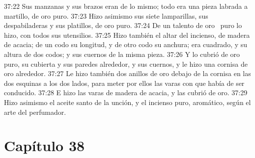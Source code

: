 37:22 Sus manzanas y sus brazos eran de lo mismo; todo era una pieza labrada a martillo, de oro puro. 
37:23 Hizo asimismo sus siete lamparillas, sus despabiladeras y sus platillos, de oro puro. 
37:24 De un talento de oro  puro lo hizo, con todos sus utensilios. 
37:25 Hizo también el altar del incienso, de madera de acacia; de un codo su longitud, y de otro codo su anchura; era cuadrado, y su altura de dos codos; y sus cuernos de la misma pieza. 
37:26 Y lo cubrió de oro puro, su cubierta y sus paredes alrededor, y sus cuernos, y le hizo una cornisa de oro alrededor. 
37:27 Le hizo también dos anillos de oro debajo de la cornisa en las dos esquinas a los dos lados, para meter por ellos las varas con que había de ser conducido. 
37:28 E hizo las varas de madera de acacia, y las cubrió de oro. 
37:29 Hizo asimismo el aceite santo de la unción, y el incienso puro, aromático, según el arte del perfumador. 
\section*{Capítulo 38}

